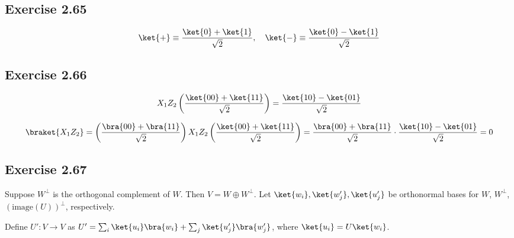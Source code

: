 \documentclass[a4paper,12pt]{article}
\begin{document}
\subsection*{Exercise 2.65}

\begin{align*}
    \ket{+} \equiv \frac{\ket{0} + \ket{1}}{\sqrt{2}}, ~~~ \ket{-} \equiv \frac{\ket{0} - \ket{1}}{\sqrt{2}}
\end{align*}


\subsection*{Exercise 2.66}

\begin{align*}
     X_1 Z_2 \left(\frac{\ket{00} + \ket{11}}{\sqrt{2}} \right) = \frac{\ket{10} - \ket{01}}{\sqrt{2}}
\end{align*}


\begin{align*}
     \braket{X_1 Z_2} = \left(\frac{\bra{00} + \bra{11}}{\sqrt{2}} \right) X_1 Z_2 \left(\frac{\ket{00} + \ket{11}}{\sqrt{2}} \right)
    = \frac{\bra{00} + \bra{11}}{\sqrt{2}}  \cdot \frac{\ket{10} - \ket{01}}{\sqrt{2}}
    = 0
\end{align*}



\subsection*{Exercise 2.67}

Suppose $W^\perp$ is the orthogonal complement of $W$. Then $V = W \oplus W^\perp$.
Let $\ket{w_i},\ket{w_j'},\ket{u_j'}$ be orthonormal bases for $W$, $W^\perp$, $\left( \mathrm{image}(U) \right)^\perp$, respectively.

Define $U': V \rightarrow V$ as $U' = \sum_i \ket{u_i}\bra{w_i} + \sum_j \ket{u_j'}\bra{w_j'}$,
where $\ket{u_i} = U \ket{w_i}$.
\end{document}
